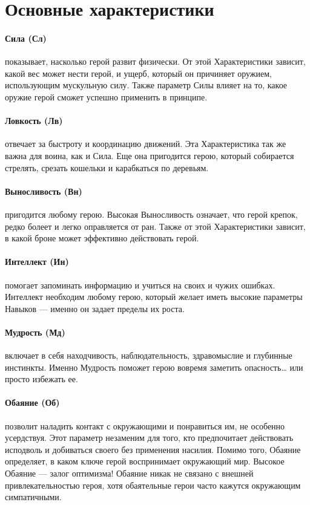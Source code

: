 \section{Основные характеристики}
\paragraph{Сила (Сл)} показывает, насколько герой развит физически. От этой Характеристики зависит, какой вес может нести герой, и ущерб, который он причиняет оружием, использующим мускульную силу. Также параметр Силы влияет на то, какое оружие герой сможет успешно применить в принципе.
\paragraph{Ловкость (Лв)} отвечает за быстроту и координацию движений. Эта Характеристика так же важна для воина, как и Сила. Еще она пригодится герою, который собирается стрелять, срезать кошельки и карабкаться по деревьям.
\paragraph{Выносливость (Вн)} пригодится любому герою. Высокая Выносливость означает, что герой крепок, редко болеет и легко оправляется от ран. Также от этой Характеристики зависит, в какой броне может эффективно действовать герой.
\paragraph{Интеллект (Ин)} помогает запоминать информацию и учиться на своих и чужих ошибках. Интеллект необходим любому герою, который желает иметь высокие параметры Навыков — именно он задает пределы их роста.
\paragraph{Мудрость (Мд)} включает в себя находчивость, наблюдательность, здравомыслие и глубинные инстинкты. Именно Мудрость поможет герою вовремя заметить опасность… или просто избежать ее.
\paragraph{Обаяние (Об)} позволит наладить контакт с окружающими и понравиться им, не особенно усердствуя. Этот параметр незаменим для того, кто предпочитает действовать исподволь и добиваться своего без применения насилия. Помимо того, Обаяние определяет, в каком ключе герой воспринимает окружающий мир. Высокое Обаяние — залог оптимизма! Обаяние никак не связано с внешней привлекательностью героя, хотя обаятельные герои часто кажутся окружающим симпатичными.
